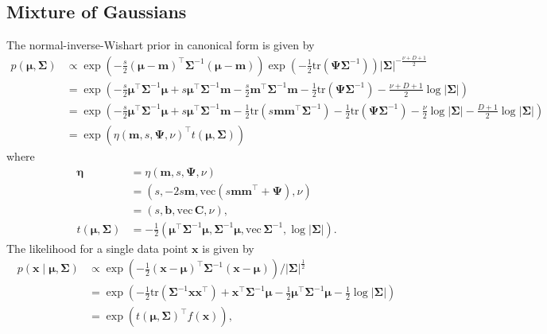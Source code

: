 \documentclass[a4paper]{article}
\begin{document}
		\subsection*{Mixture of Gaussians}
			The normal-inverse-Wishart prior in canonical form is given by
			\begin{align}
				p(\bm{\mu}, \bm{\Sigma})
					&\propto \exp\left( -\frac{s}{2} (\bm{\mu} - \mathbf{m})^\top \bm{\Sigma}^{-1} (\bm{\mu} - \mathbf{m}) \right) 
					\exp\left( -\frac{1}{2} \text{tr}(\bm{\Psi}\bm{\Sigma}^{-1}) \right) |\bm{\Sigma}|^{-\frac{\nu + D + 1}{2}} \\
					&= \exp\left( -\frac{s}{2} \bm{\mu}^\top \bm{\Sigma}^{-1} \bm{\mu} + s \bm{\mu}^\top \bm{\Sigma}^{-1} \mathbf{m}
					- \frac{s}{2} \mathbf{m}^\top\bm{\Sigma}^{-1}\mathbf{m} - \frac{1}{2} \text{tr}(\bm{\Psi}\bm{\Sigma}^{-1})
					- \frac{\nu + D + 1}{2} \log |\bm{\Sigma}| \right) \\
				&= \exp\left( -\frac{s}{2} \bm{\mu}^\top \bm{\Sigma}^{-1} \bm{\mu} + s \bm{\mu}^\top \bm{\Sigma}^{-1} \mathbf{m}
					- \frac{1}{2} \text{tr}(s\mathbf{m}\mathbf{m}^\top\bm{\Sigma}^{-1}) - \frac{1}{2} \text{tr}(\bm{\Psi}\bm{\Sigma}^{-1})
					- \frac{\nu}{2} \log |\bm{\Sigma}| - \frac{D + 1}{2} \log |\bm{\Sigma}| \right) \\
				&= \exp\left( \eta(\mathbf{m}, s, \bm{\Psi}, \nu)^\top t(\bm{\mu}, \bm{\Sigma}) \right)
			\end{align}
			where
			\begin{align}
				\bm{\eta} 
					&= \eta(\mathbf{m}, s, \bm{\Psi}, \nu) \\
					&= \left( s, -2s\mathbf{m}, \text{vec}(s\mathbf{m}\mathbf{m}^\top + \bm{\Psi}), \nu \right) \\
					&= \left( s, \mathbf{b}, \text{vec}\, \mathbf{C}, \nu \right), \\
				t(\bm{\mu}, \bm{\Sigma})
					&= -\frac{1}{2} \left( \bm{\mu}^\top \bm{\Sigma}^{-1} \bm{\mu}, \bm{\Sigma}^{-1}\bm{\mu}, \text{vec}\, \bm{\Sigma}^{-1}, \log|\bm{\Sigma}| \right).
			\end{align}
			The likelihood for a single data point $\mathbf{x}$ is given by
			\begin{align}
				p(\mathbf{x} \mid \bm{\mu}, \bm{\Sigma})
					&\propto \exp\left( -\frac{1}{2} (\mathbf{x} - \bm{\mu})^\top \bm{\Sigma}^{-1} (\mathbf{x} - \bm{\mu}) \right) / |\bm{\Sigma}|^\frac{1}{2} \\
					&= \exp\left( -\frac{1}{2} \text{tr}\left(\bm{\Sigma}^{-1} \mathbf{x}\mathbf{x}^\top \right) + \mathbf{x}^\top \bm{\Sigma}^{-1}\bm{\mu} - \frac{1}{2} \bm{\mu}^\top \bm{\Sigma}^{-1} \bm{\mu} - \frac{1}{2} \log |\bm{\Sigma}| \right) \\
					&= \exp\left( t(\bm{\mu}, \bm{\Sigma})^\top f(\mathbf{x}) \right),
			\end{align}
\end{document}
